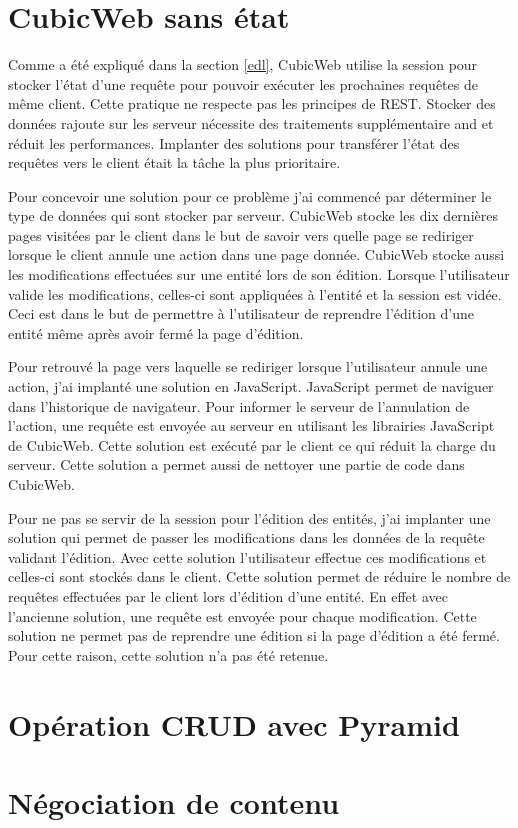 \section{CubicWeb sans état}
Comme a été expliqué dans la section \ref{edl}, CubicWeb utilise la session pour stocker l'état d'une requête pour pouvoir exécuter les prochaines requêtes de même client. Cette pratique ne respecte pas les principes de REST. Stocker des données rajoute sur les serveur nécessite des traitements supplémentaire and et réduit les performances. Implanter des solutions pour transférer l'état des requêtes vers le client était la tâche la plus prioritaire.

Pour concevoir une solution pour ce problème j'ai commencé par déterminer le type de données qui sont stocker par serveur. CubicWeb stocke les dix dernières pages visitées par le client dans le but de savoir vers quelle page se rediriger lorsque le client annule une action dans une page donnée. CubicWeb stocke aussi les modifications effectuées sur une entité lors de son édition. Lorsque l'utilisateur valide les modifications, celles-ci sont appliquées à l'entité et la session est vidée. Ceci est dans le but de permettre à l'utilisateur de reprendre l'édition d'une entité même après avoir fermé la page d'édition. 

Pour retrouvé la page vers laquelle se rediriger lorsque l'utilisateur annule une action, j'ai implanté une solution en JavaScript. JavaScript permet de naviguer dans l'historique de navigateur. Pour informer le serveur de l'annulation de l'action, une requête  est envoyée au serveur en utilisant les librairies JavaScript de CubicWeb. Cette solution est exécuté par le client ce qui réduit la charge du serveur. Cette solution a permet aussi de nettoyer une partie de code dans CubicWeb.

Pour ne pas se servir de la session pour l'édition des entités, j'ai implanter une solution qui permet de passer les modifications dans les données de la requête validant l'édition. Avec cette solution l'utilisateur effectue ces modifications et celles-ci sont stockés dans le client. Cette solution permet de réduire le nombre de requêtes effectuées par le client lors d'édition d'une entité. En effet avec l'ancienne solution, une requête est envoyée pour chaque modification. Cette solution ne permet pas de reprendre une édition si la page d'édition a été fermé. Pour cette raison, cette solution n'a pas été retenue.

\section{Opération CRUD avec Pyramid}

\section{Négociation de contenu} 
 
